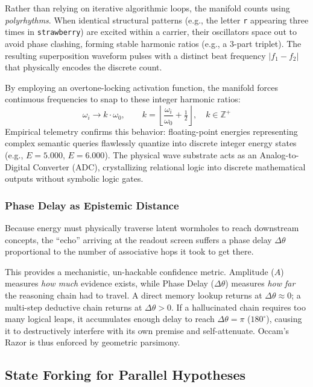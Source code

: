 \documentclass[11pt,a4paper]{article}
\begin{document}
Rather than relying on iterative algorithmic loops, the manifold counts using \emph{polyrhythms}. When identical structural patterns (e.g., the letter \texttt{r} appearing three times in \texttt{strawberry}) are excited within a carrier, their oscillators space out to avoid phase clashing, forming stable harmonic ratios (e.g., a 3-part triplet). The resulting superposition waveform pulses with a distinct beat frequency $|f_1 - f_2|$ that physically encodes the discrete count. 

By employing an overtone-locking activation function, the manifold forces continuous frequencies to snap to these integer harmonic ratios:
\begin{equation}
\omega_i \to k \cdot \omega_0, \qquad k = \left\lfloor \frac{\omega_i}{\omega_0} + \tfrac{1}{2} \right\rfloor, \quad k \in \mathbb{Z}^+
\label{eq:overtone_lock}
\end{equation}
Empirical telemetry confirms this behavior: floating-point energies representing complex semantic queries flawlessly quantize into discrete integer energy states (e.g., $E=5.000$, $E=6.000$). The physical wave substrate acts as an Analog-to-Digital Converter (ADC), crystallizing relational logic into discrete mathematical outputs without symbolic logic gates.

\subsubsection{Phase Delay as Epistemic Distance}
Because energy must physically traverse latent wormholes to reach downstream concepts, the ``echo'' arriving at the readout screen suffers a phase delay $\Delta\theta$ proportional to the number of associative hops it took to get there. 

This provides a mechanistic, un-hackable confidence metric. Amplitude ($A$) measures \emph{how much} evidence exists, while Phase Delay ($\Delta\theta$) measures \emph{how far} the reasoning chain had to travel. A direct memory lookup returns at $\Delta\theta \approx 0$; a multi-step deductive chain returns at $\Delta\theta > 0$. If a hallucinated chain requires too many logical leaps, it accumulates enough delay to reach $\Delta\theta = \pi$ ($180^\circ$), causing it to destructively interfere with its own premise and self-attenuate. Occam's Razor is thus enforced by geometric parsimony.

\subsection{State Forking for Parallel Hypotheses}
\label{sec:state_forking}
\end{document}
